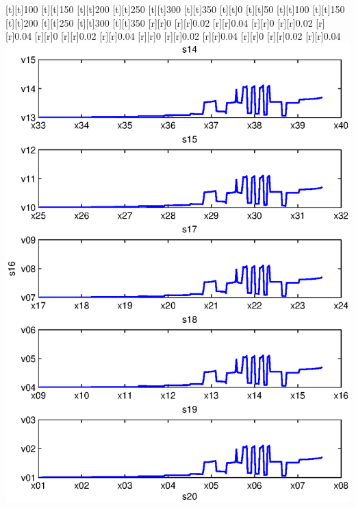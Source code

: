 \begin{psfrags}
[t][t]{100}%
[t][t]{150}%
[t][t]{200}%
[t][t]{250}%
[t][t]{300}%
[t][t]{350}%
[t][t]{0}%
[t][t]{50}%
[t][t]{100}%
[t][t]{150}%
[t][t]{200}%
[t][t]{250}%
[t][t]{300}%
[t][t]{350}%
%
[r][r]{0}%
[r][r]{0.02}%
[r][r]{0.04}%
[r][r]{0}%
[r][r]{0.02}%
[r][r]{0.04}%
[r][r]{0}%
[r][r]{0.02}%
[r][r]{0.04}%
[r][r]{0}%
[r][r]{0.02}%
[r][r]{0.04}%
[r][r]{0}%
[r][r]{0.02}%
[r][r]{0.04}%
%
\includegraphics[width=15cm]{rmse_300_256.eps}%
\end{psfrags}%
%
